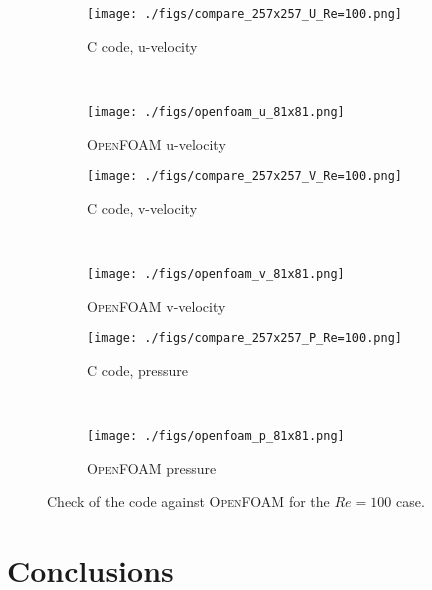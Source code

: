 \documentclass[10pt, letterpaper]{article}
\begin{document}
\begin{figure}[p]
	\centering
	\begin{subfigure}[b]{0.475\textwidth}
		\centering
		\texttt{[image: ./figs/compare\_257x257\_U\_Re=100.png]}
		\caption{C code, u-velocity}
	\end{subfigure}
	~
	\begin{subfigure}[b]{0.475\textwidth}
		\centering
		\texttt{[image: ./figs/openfoam\_u\_81x81.png]}
		\caption{\textsc{OpenFOAM} u-velocity}
	\end{subfigure}
	
	\begin{subfigure}[b]{0.475\textwidth}
		\centering
		\texttt{[image: ./figs/compare\_257x257\_V\_Re=100.png]}
		\caption{C code, v-velocity}
	\end{subfigure}
	~
	\begin{subfigure}[b]{0.475\textwidth}
		\centering
		\texttt{[image: ./figs/openfoam\_v\_81x81.png]}
		\caption{\textsc{OpenFOAM} v-velocity}
	\end{subfigure}
	
	\begin{subfigure}[b]{0.475\textwidth}
		\centering
		\texttt{[image: ./figs/compare\_257x257\_P\_Re=100.png]}
		\caption{C code, pressure}
	\end{subfigure}
	~
	\begin{subfigure}[b]{0.475\textwidth}
		\centering
		\texttt{[image: ./figs/openfoam\_p\_81x81.png]}
		\caption{\textsc{OpenFOAM} pressure}
	\end{subfigure}
	\caption{Check of the code against \textsc{OpenFOAM} for the $Re=100$ case.}
	\label{fig:openfoam}
\end{figure}

\clearpage


\section{Conclusions}
\end{document}
